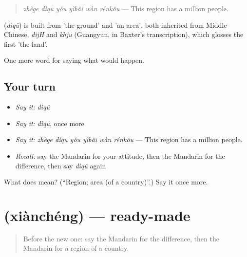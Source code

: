 \begin{quote}
\textbf{} \emph{zhège dìqū yǒu yìbǎi wàn rénkǒu} — This region has a million people.
\end{quote}

\begin{cousinweb}
\textbf{} (\emph{dìqū}) is built from  'the ground' and  'an area', both inherited from Middle Chinese, \emph{dijH} and \emph{khju} (Guangyun, in Baxter's transcription), which glosses the first 'the land'.
\end{cousinweb}

\begin{grammarlens}[title={What you've built}]
One more word for saying what would happen.
\end{grammarlens}

\subsection*{Your turn}
\begin{itemize}
\raggedright
  \item \emph{Say it:} \emph{dìqū}
  \item \emph{Say it:} \emph{dìqū}, once more
  \item \emph{Say it:} \emph{zhège dìqū yǒu yìbǎi wàn rénkǒu} — This region has a million people.
  \item \emph{Recall:} say the Mandarin for your attitude, then the Mandarin for the difference, then say \emph{dìqū} again
\end{itemize}

\begin{tcolorbox}[breakable,colback=teal!4,colframe=teal!35!black,title={Before you move on}]
What does  mean? (\textquotedblleft{}Region; area (of a country)\textquotedblright{}.) Say it once more.
\end{tcolorbox}
\section[\texorpdfstring{\zh{现成} (xiànchéng)}{现成 (xiànchéng)}]{ (xiànchéng) — ready-made}

\label{lesson:ZH-C398-xiancheng}



\begin{quote}
Before the new one: say the Mandarin for the difference, then the Mandarin for a region of a country.
\end{quote}

